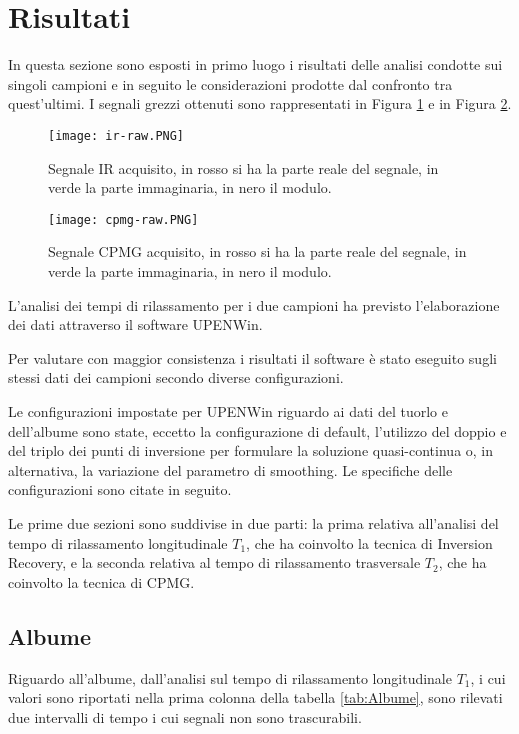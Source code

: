 \section*{Risultati}
In questa sezione sono esposti in primo luogo i risultati delle analisi condotte sui singoli campioni e in seguito le considerazioni prodotte dal confronto tra quest'ultimi. I segnali grezzi ottenuti sono rappresentati in Figura \ref{fig:ir-raw} e in Figura \ref{fig:cpmg-raw}.

\begin{figure}[ht]
\texttt{[image: ir-raw.PNG]}
\caption{Segnale IR acquisito, in rosso si ha la parte reale del segnale, in verde la parte immaginaria, in nero il modulo.}
\label{fig:ir-raw}
\end{figure}
\begin{figure}[h!]
\texttt{[image: cpmg-raw.PNG]}
\caption{Segnale CPMG acquisito, in rosso si ha la parte reale del segnale, in verde la parte immaginaria, in nero il modulo.}
\label{fig:cpmg-raw}
\end{figure} 

L'analisi dei tempi di rilassamento per i due campioni ha previsto l'elaborazione dei dati attraverso il software UPENWin.

Per valutare con maggior consistenza i risultati il software è stato eseguito sugli stessi dati dei campioni secondo diverse configurazioni.

Le configurazioni impostate per UPENWin riguardo ai dati del tuorlo e dell'albume sono state, eccetto la configurazione di default, l'utilizzo del doppio e del triplo dei punti di inversione per formulare la soluzione quasi-continua o, in alternativa, la variazione del parametro di smoothing. 
Le specifiche delle configurazioni sono citate in seguito. 

Le prime due sezioni sono suddivise in due parti: la prima relativa all'analisi del tempo di rilassamento longitudinale $T_1$, che ha coinvolto la tecnica di Inversion Recovery, e la seconda relativa al tempo di rilassamento trasversale $T_2$, che ha coinvolto la tecnica di CPMG. 



\subsection*{Albume} 

Riguardo all'albume, dall'analisi sul tempo di rilassamento longitudinale $T_1$, i cui valori sono riportati nella prima colonna della tabella \ref{tab:Albume}, sono rilevati due intervalli di tempo i cui segnali non sono trascurabili. 

